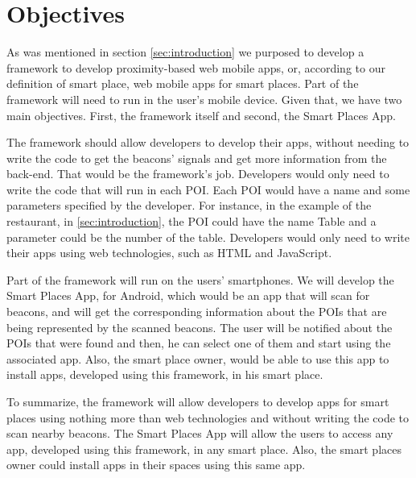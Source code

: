 
% 
% 

\section{Objectives}
\label{sec:objectives}

As was mentioned in section \ref{sec:introduction} we purposed
to develop a framework to develop proximity-based web mobile
apps, or, according to our definition of smart place, web
mobile apps for smart places.
Part of the framework will need to run in the user's 
mobile device.
Given that, we have two main objectives. First, the framework
itself and second, the Smart Places App.

The framework should allow developers to develop their apps,
without needing to write the code to get the beacons' signals
and get more information from the back-end. That would be the
framework's job. Developers would only need to write the code
that will run in each POI. Each POI would have a name and
some parameters specified by the developer. 
For instance, in the example of the restaurant,
in \ref{sec:introduction}, the POI could have the name Table and
a parameter could be the number of the table.
Developers would only need to write their apps using web
technologies, such as HTML and JavaScript.

Part of the framework will run on the users' smartphones.
We will develop the Smart Places App, for Android, which would
be an  app that will scan for beacons, and will get the 
corresponding information about the POIs that are being 
represented by the scanned beacons.
The user will be notified about the POIs
that were found and then, he can select one of them and
start using the associated app. 
Also, the smart place owner, would be able to use this app
to install apps, developed using this framework, in his
smart place.

To summarize, the framework will allow developers to develop
apps for smart places using nothing more than web technologies
and without writing the code to scan nearby beacons.
The Smart Places App will allow the users to access any app,
developed using this framework, in any smart place. Also,
the smart places owner could install apps in their spaces
using this same app.
